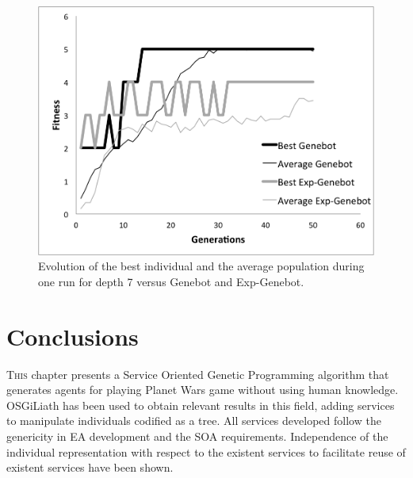 \begin{figure}
\centering
\includegraphics[scale =0.60] {gfx/rts/generations.png}
\caption{Evolution of the best individual and the average population during one run for depth 7 versus Genebot and Exp-Genebot.}
\label{fig:gens}
\end{figure}
 
\section{Conclusions}
\label{sec:conclusion}

\lettrine{T}{his} chapter presents a Service Oriented Genetic Programming algorithm that generates
agents for playing Planet Wars game without using human knowledge. OSGiLiath has been used to obtain relevant results in this field, adding services to manipulate individuals codified as a tree. All services developed follow the genericity in EA development and the SOA requirements. Independence of the individual representation with respect to the existent services to facilitate reuse of existent services have been shown. 





